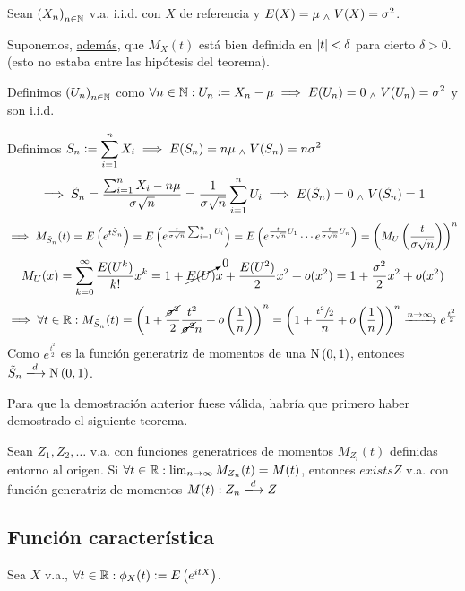 
\begin{dem}
	Sean $\left(X_n\right)_{n\in \mathbb{N}}$ v.a. i.i.d. con $X$ de referencia y $E(X) = \mu \; _{\wedge} \; V(X) = \sigma^2$.

	Suponemos, \underline{además}, que $M_X(t)$ está bien definida en $\left|t\right| < \delta$ para cierto $\delta > 0$. (esto no estaba entre las hipótesis del teorema).

	Definimos $\displaystyle \left(U_n\right)_{n\in \mathbb{N}}$ como $\displaystyle \forall n \in \mathbb{N} : U_n \vcentcolon= X_n - \mu \implies E(U_n) = 0 \; _{\wedge} \; V(U_n) = \sigma^2$ y son i.i.d.

	Definimos $\displaystyle S_n \vcentcolon= \sum_{i=1}^{n} X_i \implies E(S_n) = n\mu \; _{\wedge} \; V(S_n) = n\sigma^2$
	\[\implies \tilde{S}_n = \frac{\sum_{i=1}^{n} X_i - n\mu}{\sigma\sqrt{n}} = \frac{1}{\sigma\sqrt{n}}\sum_{i=1}^{n} U_i \implies E(\tilde{S}_n) = 0 \; _{\wedge} \; V(\tilde{S}_n) = 1\]
	\[\implies M_{\tilde{S}_n}(t) = E\left(e^{t\tilde{S}_n}\right) = E\left(e^{\frac{t}{\sigma\sqrt{n}}\sum_{i=1}^{n} U_i}\right) = E\left(e^{\frac{t}{\sigma\sqrt{n}}U_1} \cdots e^{\frac{t}{\sigma\sqrt{n}}U_n}\right) = \left(M_U\left(\frac{t}{\sigma\sqrt{n}}\right)\right)^n\]
	\[M_U(x) = \sum_{k=0}^{\infty} \frac{E(U^k)}{k!}x^k = 1 + \cancelto{0}{E(U)} x + \frac{E(U^2)}{2}x^2 + o(x^2) = 1 + \frac{\sigma^2}{2}x^2 + o(x^2)\]
	\[\implies \forall t \in \mathbb{R} : M_{\tilde{S}_n}(t) = \left(1 + \frac{\cancel{\sigma^2}}{2}\frac{t^2}{\cancel{\sigma^2}n} + o\left(\frac{1}{n}\right)\right)^n = \left(1 + \frac{\sfrac{t^2}{2}}{n} + o\left(\frac{1}{n}\right)\right)^n \xrightarrow{n\to\infty} e^{\frac{t^2}{2}}\]
	Como $e^{\frac{t^2}{2}}$ es la función generatriz de momentos de una $\operatorname{N}\left(0,1\right)$, entonces $\til{S}_n \xlongrightarrow{d} \normal{0,1}$.
\end{dem}

Para que la demostración anterior fuese válida, habría que primero haber demostrado el siguiente teorema.
\begin{teo}
	Sean $Z_1, Z_2, \dots$ v.a. con funciones generatrices de momentos $M_{Z_i}(t)$ definidas entorno al origen. Si $\forall t \in \mathbb{R} : \lim_{n\to\infty} M_{Z_n}(t) = M(t)$, entonces $exists Z$ v.a. con función generatriz de momentos $M(t) : Z_n \xlongrightarrow{d} Z$
\end{teo}

\subsection{Función característica}

\begin{defn}
	Sea $X$ v.a., $\forall t \in \mathbb{R} : \phi_X(t) \vcentcolon= E\left(e^{itX}\right)$.
\end{defn}

